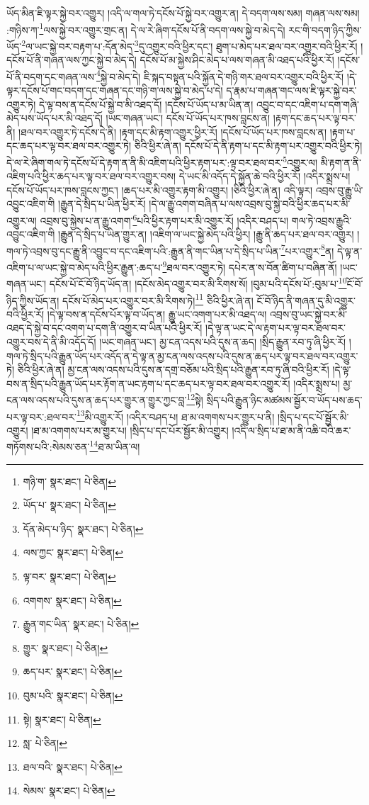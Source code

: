 ཡོད་མིན་ཇི་ལྟར་སྐྱེ་བར་འགྱུར། །འདི་ལ་གལ་ཏེ་དངོས་པོ་སྐྱེ་བར་འགྱུར་ན། དེ་བདག་ལས་སམ། གཞན་ལས་སམ། :གཉིས་ཀ་\footnote{གཉི་ག་  སྣར་ཐང་།  པེ་ཅིན། }ལས་སྐྱེ་བར་འགྱུར་གྲང་ན། དེ་ལ་རེ་ཞིག་དངོས་པོ་ནི་བདག་ལས་སྐྱེ་བ་མེད་དེ། རང་གི་བདག་ཉིད་ཀྱིས་ཡོད་\footnote{ཡོད་པ་  སྣར་ཐང་།  པེ་ཅིན། }ལ་ཡང་སྐྱེ་བར་བརྟག་པ་:དོན་མེད་\footnote{དོན་མེད་པ་ཉིད་  སྣར་ཐང་།  པེ་ཅིན། }དུ་འགྱུར་བའི་ཕྱིར་དང་། ཐུག་པ་མེད་པར་ཐལ་བར་འགྱུར་བའི་ཕྱིར་རོ། །དངོས་པོ་ནི་གཞན་ལས་ཀྱང་སྐྱེ་བ་མེད་དེ། དངོས་པོ་མ་སྐྱེས་ཤིང་མེད་པ་ལས་གཞན་མི་འཐད་པའི་ཕྱིར་རོ། །དངོས་པོ་ནི་བདག་དང་གཞན་ལས་\footnote{ལས་ཀྱང་  སྣར་ཐང་།  པེ་ཅིན། }སྐྱེ་བ་མེད་དེ། ཇི་སྐད་བསྟན་པའི་སྐྱོན་དེ་གཉི་གར་ཐལ་བར་འགྱུར་བའི་ཕྱིར་རོ། །དེ་ལྟར་དངོས་པོ་གང་བདག་དང་གཞན་དང་གཉི་ག་ལས་སྐྱེ་བ་མེད་པ་དེ། ད་རྣམ་པ་གཞན་གང་ལས་ཇི་ལྟར་སྐྱེ་བར་འགྱུར་ཏེ། དེ་ལྟ་བས་ན་དངོས་པོ་སྐྱེ་བ་མི་འཐད་དོ། །དངོས་པོ་ཡོད་པ་མ་ཡིན་ན། འབྱུང་བ་དང་འཇིག་པ་དག་གཞི་མེད་པས་ཡོད་པར་མི་འཐད་དོ། །ཡང་གཞན་ཡང་། དངོས་པོ་ཡོད་པར་ཁས་བླངས་ན། །རྟག་དང་ཆད་པར་ལྟ་བར་ནི། །ཐལ་བར་འགྱུར་ཏེ་དངོས་དེ་ནི། །རྟག་དང་མི་རྟག་འགྱུར་ཕྱིར་རོ། །དངོས་པོ་ཡོད་པར་ཁས་བླངས་ན། །རྟག་པ་དང་ཆད་པར་ལྟ་བར་ཐལ་བར་འགྱུར་ཏེ། ཅིའི་ཕྱིར་ཞེ་ན། དངོས་པོ་དེ་ནི་རྟག་པ་དང་མི་རྟག་པར་འགྱུར་བའི་ཕྱིར་ཏེ། དེ་ལ་རེ་ཞིག་གལ་ཏེ་དངོས་པོ་དེ་རྟག་ན་ནི་མི་འཇིག་པའི་ཕྱིར་རྟག་པར་:ལྟ་བར་ཐལ་བར་\footnote{ལྟ་བར་  སྣར་ཐང་།  པེ་ཅིན། }འགྱུར་ལ། མི་རྟག་ན་ནི་འཇིག་པའི་ཕྱིར་ཆད་པར་ལྟ་བར་ཐལ་བར་འགྱུར་བས། དེ་ཡང་མི་འདོད་དེ་སྐྱོན་ཆེ་བའི་ཕྱིར་རོ། །འདིར་སྨྲས་པ། དངོས་པོ་ཡོད་པར་ཁས་བླངས་ཀྱང་། །ཆད་པར་མི་འགྱུར་རྟག་མི་འགྱུར། །ཅིའི་ཕྱིར་ཞེ་ན། འདི་ལྟར། འབྲས་བུ་རྒྱུ་ཡི་འབྱུང་འཇིག་གི །རྒྱུན་དེ་སྲིད་པ་ཡིན་ཕྱིར་རོ། །དེ་ལ་རྒྱུ་འགག་བཞིན་པ་ལས་འབྲས་བུ་སྐྱེ་བའི་ཕྱིར་ཆད་པར་མི་འགྱུར་ལ། འབྲས་བུ་སྐྱེས་པ་ན་རྒྱུ་འགག་\footnote{འགགས་  སྣར་ཐང་།  པེ་ཅིན། }པའི་ཕྱིར་རྟག་པར་མི་འགྱུར་རོ། །འདིར་བཤད་པ། གལ་ཏེ་འབྲས་རྒྱུའི་འབྱུང་འཇིག་གི །རྒྱུན་དེ་སྲིད་པ་ཡིན་གྱུར་ན། །འཇིག་ལ་ཡང་སྐྱེ་མེད་པའི་ཕྱིར། །རྒྱུ་ནི་ཆད་པར་ཐལ་བར་འགྱུར། །གལ་ཏེ་འབྲས་བུ་དང་རྒྱུ་ནི་འབྱུང་བ་དང་འཇིག་པའི་:རྒྱུན་ནི་གང་ཡིན་པ་དེ་སྲིད་པ་ཡིན་\footnote{རྒྱུན་གང་ཡིན་  སྣར་ཐང་།  པེ་ཅིན། }པར་འགྱུར་\footnote{གྱུར་  སྣར་ཐང་།  པེ་ཅིན། }ན། དེ་ལྟ་ན་འཇིག་པ་ལ་ཡང་སྐྱེ་བ་མེད་པའི་ཕྱིར་རྒྱུན་:ཆད་པ་\footnote{ཆད་པར་  སྣར་ཐང་།  པེ་ཅིན། }ཐལ་བར་འགྱུར་ཏེ། དཔེར་ན་ས་བོན་ཚིག་པ་བཞིན་ནོ། །ཡང་གཞན་ཡང་། དངོས་པོ་ངོ་བོ་ཉིད་ཡོད་ན། །དངོས་མེད་འགྱུར་བར་མི་རིགས་སོ། །བུམ་པའི་དངོས་པོ་:བུམ་པ་\footnote{བུམ་པའི་  སྣར་ཐང་།  པེ་ཅིན། }ངོ་བོ་ཉིད་ཀྱིས་ཡོད་ན། དངོས་པོ་མེད་པར་འགྱུར་བར་མི་རིགས་ཏེ།\footnote{སྟེ།  སྣར་ཐང་།  པེ་ཅིན། } ཅིའི་ཕྱིར་ཞེ་ན། ངོ་བོ་ཉིད་ནི་གཞན་དུ་མི་འགྱུར་བའི་ཕྱིར་རོ། །དེ་ལྟ་བས་ན་དངོས་པོར་ལྟ་བ་ཡོད་ན། རྒྱུ་ཡང་འགག་པར་མི་འཐད་ལ། འབྲས་བུ་ཡང་སྐྱེ་བར་མི་འཐད་དེ་སྐྱེ་བ་དང་འགག་པ་དག་ནི་འགྱུར་བ་ཡིན་པའི་ཕྱིར་རོ། །དེ་ལྟ་ན་ཡང་དེ་ལ་རྟག་པར་ལྟ་བར་ཐལ་བར་འགྱུར་བས་དེ་ནི་མི་འདོད་དོ། །ཡང་གཞན་ཡང་། མྱ་ངན་འདས་པའི་དུས་ན་ཆད། །སྲིད་རྒྱུན་རབ་ཏུ་ཞི་ཕྱིར་རོ། །གལ་ཏེ་སྲིད་པའི་རྒྱུན་ཡོད་པར་འདོད་ན་དེ་ལྟ་ན་མྱ་ངན་ལས་འདས་པའི་དུས་ན་ཆད་པར་ལྟ་བར་ཐལ་བར་འགྱུར་ཏེ། ཅིའི་ཕྱིར་ཞེ་ན། མྱ་ངན་ལས་འདས་པའི་དུས་ན་དགྲ་བཅོམ་པའི་སྲིད་པའི་རྒྱུན་རབ་ཏུ་ཞི་བའི་ཕྱིར་རོ། །དེ་ལྟ་བས་ན་སྲིད་པའི་རྒྱུན་ཡོད་པར་རྟོག་ན་ཡང་རྟག་པ་དང་ཆད་པར་ལྟ་བར་ཐལ་བར་འགྱུར་རོ། །འདིར་སྨྲས་པ། མྱ་ངན་ལས་འདས་པའི་དུས་ན་ཆད་པར་གྱུར་ན་གྱུར་ཀྱང་བླ་\footnote{སླ་  པེ་ཅིན། }སྟེ། སྲིད་པའི་རྒྱུན་ཉིང་མཚམས་སྦྱོར་བ་ཡོད་པས་ཆད་པར་ལྟ་བར་:ཐལ་བར་\footnote{ཐལ་བའི་  སྣར་ཐང་།  པེ་ཅིན། }མི་འགྱུར་རོ། །འདིར་བཤད་པ། ཐ་མ་འགགས་པར་གྱུར་པ་ནི། །སྲིད་པ་དང་པོ་སྦྱོར་མི་འགྱུར། །ཐ་མ་འགགས་པར་མ་གྱུར་པ། །སྲིད་པ་དང་པོར་སྦྱོར་མི་འགྱུར། །འདི་ལ་སྲིད་པ་ཐ་མ་ནི་འཆི་བའི་ཆར་གཏོགས་པའི་:སེམས་ཅན་\footnote{སེམས་  སྣར་ཐང་།  པེ་ཅིན། }ཐ་མ་ཡིན་ལ། 